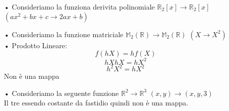 \begin{itemize}
\item[•] Consideriamo la funziona derivita polinomiale $\mathbb{R}_2[x] \rightarrow \mathbb{R}_2[x]$ $(ax^2+bx+c \rightarrow 2ax+b)$ \\

\item[•] Consideriamo la funzione matriciale $\mathbb{M}_2(\mathbb{R}) \rightarrow \mathbb{M}_2(\mathbb{R})$ $(X \rightarrow X^2)$\\

\subitem • Prodotto Lineare:
$$ f(hX) = hf(X) $$
$$ hXhX = hX^2$$
$$ h^2X^2 = hX^2$$
Non è una mappa\\

\item[•] Consideriamo la seguente funzione $\mathbb{R}^2 \rightarrow \mathbb{R}^3$ $(x,y) \rightarrow (x,y,3)$\\
Il tre essendo costante da fastidio quindi non è una mappa.



\end{itemize}


